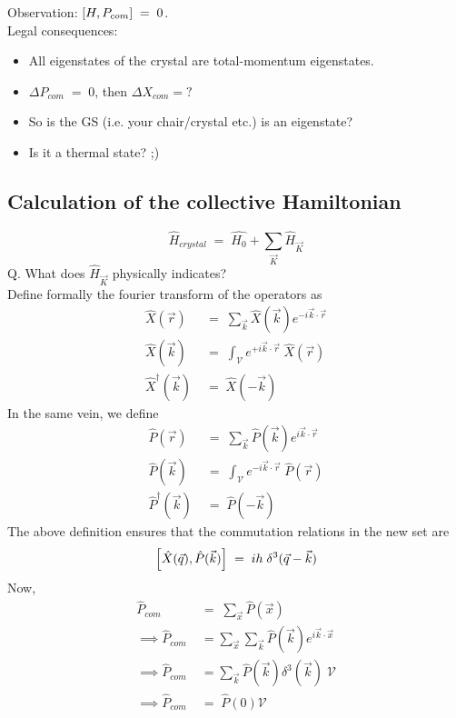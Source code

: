 \documentclass[12pt]{article}
\begin{document}
Observation: $\comm{H}{P_{com}}\;=\;0$.\\

Legal consequences:
\begin{itemize}
    \item All eigenstates of the crystal are total-momentum eigenstates.
    \item $\Delta P_{com}\;=\;0$, then $\Delta X_{com}=?$
    \item So is the GS (i.e. your chair/crystal etc.) is an eigenstate?
    \item Is it a thermal state? ;)
\end{itemize}
\newpage
\subsection{Calculation of the collective Hamiltonian}
$$  \hat{H}_{crystal}\;=\;\hat{H_0} + \sum_{\Vec{K}}\hat{H}_{\Vec{K}}$$
Q. What does $\hat{H}_{\Vec{K}}$ physically indicates?\\
Define formally the fourier transform of the operators as 
\begin{align}
    \hat{X}(\Vec{r})\;&=\;\sum_{\Vec{k}} \hat{X}(\Vec{k}) e^{-i\Vec{k}\cdot\Vec{r}}\\
    \hat{X}(\Vec{k})\;&=\;\int_{\mathcal{V}} e^{+i\Vec{k}\cdot\Vec{r}}\;\hat{X}(\Vec{r})\\
    \hat{X}^{\dagger}(\Vec{k})\;&=\; \hat{X}(-\Vec{k})
\end{align}
In the same vein, we define 
\begin{align}
 \hat{P}(\Vec{r})\;&=\;\sum_{\Vec{k}} \hat{P}(\Vec{k}) e^{i\Vec{k}\cdot\Vec{r}}\\
    \hat{P}(\Vec{k})\;&=\;\int_{\mathcal{V}} e^{-i\Vec{k}\cdot\Vec{r}}\;\hat{P}(\Vec{r})\\
    \hat{P}^{\dagger}(\Vec{k})\;&=\; \hat{P}(-\Vec{k})
\end{align}
The above definition ensures that the commutation relations in the new set are 
\begin{equation}
    \comm{\hat{X}(\Vec{q})}{\hat{P}(\Vec{k})}\;=\;ih\;\delta^3(\Vec{q}-\Vec{k})
\end{equation}
Now,
\begin{align}
    \hat{P}_{com}\;&=\;\sum_{\Vec{x}} \hat{P}(\Vec{x})\\
    \implies \hat{P}_{com}\;&=\sum_{\Vec{x}}\sum_{\Vec{k}} \hat{P}(\Vec{k}) e^{i\Vec{k}\cdot\Vec{x}}\\
    \implies \hat{P}_{com}\;&=\sum_{\Vec{k}} \hat{P}(\Vec{k}) \delta^{3}(\Vec{k})\;\mathcal{V}\\
    \implies \hat{P}_{com}\;&=\;\hat{P}(0)\mathcal{V}
\end{align}
\end{document}
